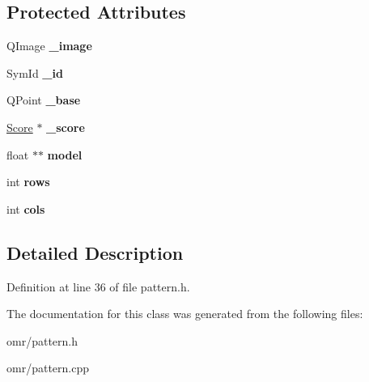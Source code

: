 \subsection*{Protected Attributes}
\begin{DoxyCompactItemize}
\item 
\mbox{\label{class_ms_1_1_pattern_a4b0d6818d471fb75a701ff42a3e7245a}} 
Q\+Image {\bfseries \+\_\+image}
\item 
\mbox{\label{class_ms_1_1_pattern_ae2cdf0e964ca4d1e90a26de97818924f}} 
Sym\+Id {\bfseries \+\_\+id}
\item 
\mbox{\label{class_ms_1_1_pattern_a391739ec6d4ae146ebd7e2051824b9df}} 
Q\+Point {\bfseries \+\_\+base}
\item 
\mbox{\label{class_ms_1_1_pattern_afa6366be9fe04b8291f63466b41041e4}} 
\hyperlink{class_ms_1_1_score}{Score} $\ast$ {\bfseries \+\_\+score}
\item 
\mbox{\label{class_ms_1_1_pattern_a1f495c7016b88f108d5ee1978566a082}} 
float $\ast$$\ast$ {\bfseries model}
\item 
\mbox{\label{class_ms_1_1_pattern_a8b77228e7a410ed5bb35a86c1acd28e0}} 
int {\bfseries rows}
\item 
\mbox{\label{class_ms_1_1_pattern_ac41fc3b0bc5f34935e51d105cc48bed0}} 
int {\bfseries cols}
\end{DoxyCompactItemize}


\subsection{Detailed Description}


Definition at line 36 of file pattern.\+h.



The documentation for this class was generated from the following files\+:\begin{DoxyCompactItemize}
\item 
omr/pattern.\+h\item 
omr/pattern.\+cpp\end{DoxyCompactItemize}

